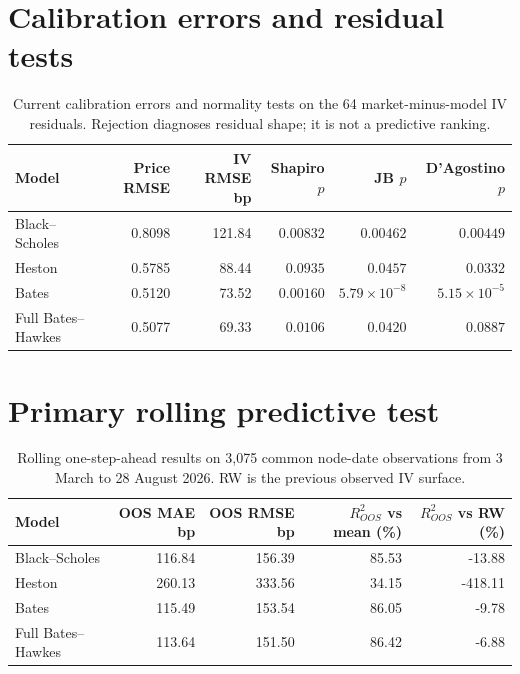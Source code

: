 \documentclass[a4paper,10pt,titlepage,oneside,openany]{book}
\theoremstyle{plain}
\theoremstyle{definition}
\theoremstyle{remark}
\begin{document}
\section*{Calibration errors and residual tests}
\begin{table}[H]
\centering
\scriptsize
\setlength{\tabcolsep}{3pt}
\begin{tabular}{@{}lrrrrr@{}}
\toprule
Model & Price RMSE & IV RMSE bp & Shapiro $p$ & JB $p$ & D'Agostino $p$ \\
\midrule
Black--Scholes & 0.8098 & 121.84 & $0.00832$ & $0.00462$ & $0.00449$ \\
Heston & 0.5785 & 88.44 & $0.0935$ & $0.0457$ & $0.0332$ \\
Bates & 0.5120 & 73.52 & $0.00160$ & $5.79\times10^{-8}$ & $5.15\times10^{-5}$ \\
Full Bates--Hawkes & 0.5077 & 69.33 & $0.0106$ & $0.0420$ & $0.0887$ \\
\bottomrule
\end{tabular}
\caption{Current calibration errors and normality tests on the 64 market-minus-model IV residuals. Rejection diagnoses residual shape; it is not a predictive ranking.}
\label{tab:appendix-errors-normality}
\end{table}

\section*{Primary rolling predictive test}
\begin{table}[H]
\centering
\scriptsize
\begin{tabular}{@{}lrrrr@{}}
\toprule
Model & OOS MAE bp & OOS RMSE bp & $R^2_{OOS}$ vs mean (\%) & $R^2_{OOS}$ vs RW (\%) \\
\midrule
Black--Scholes & 116.84 & 156.39 & 85.53 & -13.88 \\
Heston & 260.13 & 333.56 & 34.15 & -418.11 \\
Bates & 115.49 & 153.54 & 86.05 & -9.78 \\
Full Bates--Hawkes & 113.64 & 151.50 & 86.42 & -6.88 \\
\bottomrule
\end{tabular}
\caption{Rolling one-step-ahead results on 3,075 common node-date observations from 3 March to 28 August 2026. RW is the previous observed IV surface.}
\label{tab:appendix-online}
\end{table}
\end{document}
